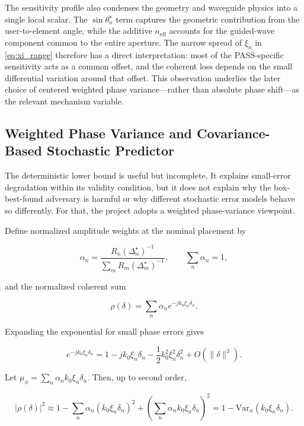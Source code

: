 The sensitivity profile also condenses the geometry and waveguide physics into a single local scalar. The $\sin \theta_n^\star$ term captures the geometric contribution from the user-to-element angle, while the additive $n_{\mathrm{eff}}$ accounts for the guided-wave component common to the entire aperture. The narrow spread of $\xi_n$ in \eqref{eq:xi_range} therefore has a direct interpretation: most of the PASS-specific sensitivity acts as a common offset, and the coherent loss depends on the small differential variation around that offset. This observation underlies the later choice of centered weighted phase variance—rather than absolute phase shift—as the relevant mechanism variable.

\subsection{Weighted Phase Variance and Covariance-Based Stochastic Predictor}

The deterministic lower bound is useful but incomplete. It explains small-error degradation within its validity condition, but it does not explain why the box-best-found adversary is harmful or why different stochastic error models behave so differently. For that, the project adopts a weighted phase-variance viewpoint.

Define normalized amplitude weights at the nominal placement by

\begin{equation}
\alpha_n
= \frac{R_n(\Delta_n^\star)^{-1}}{\sum_m R_m(\Delta_m^\star)^{-1}},
\qquad
\sum_n \alpha_n = 1,
\label{eq:alpha_def}
\end{equation}

and the normalized coherent sum

\begin{equation}
\rho(\delta)
= \sum_n \alpha_n e^{-j k_0 \xi_n \delta_n}.
\label{eq:rho_alpha}
\end{equation}

Expanding the exponential for small phase errors gives

\begin{equation}
e^{-j k_0 \xi_n \delta_n}
= 1 - j k_0 \xi_n \delta_n - \frac{1}{2} k_0^2 \xi_n^2 \delta_n^2 + O(\lVert \delta \rVert^3).
\label{eq:expansion}
\end{equation}

Let $\mu_\phi = \sum_n \alpha_n k_0 \xi_n \delta_n$. Then, up to second order,

\begin{equation}
|\rho(\delta)|^2
\approx
1
- \sum_n \alpha_n (k_0 \xi_n \delta_n)^2
+ \left(\sum_n \alpha_n k_0 \xi_n \delta_n\right)^2
= 1 - \mathrm{Var}_\alpha(k_0 \xi_n \delta_n).
\label{eq:variance_mechanism}
\end{equation}

